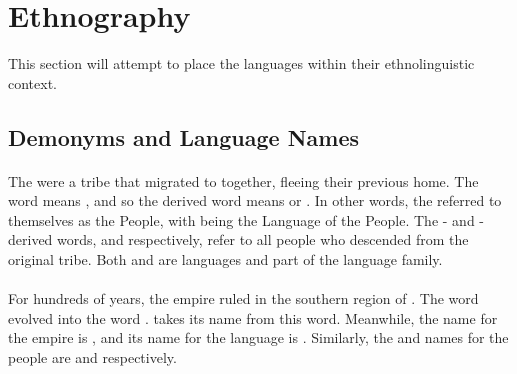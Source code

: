 \section{Ethnography}
\label{sec:tvk-ethnography}

This section will attempt to place the \langtvk{} languages within their ethnolinguistic context.

\subsection{Demonyms and Language Names}
\label{subsec:tvk-demonyms}

\paragraph{\langtvk}

The \peoptvk{} were a tribe that migrated to \landn{} together, fleeing their previous home. The \langtvk{} word   means , and so the derived word \fw{\npeoptvk}  means  or . In other words, the \peoptvk{} referred to themselves as the People, with \fw{\nlangtvk} being the Language of the People. The \langank- and \langrdk-derived words,   and   respectively, refer to all people who descended from the original \peoptvk{} tribe. Both \langank{} and \langrdk{} are \peoptvk{} languages and part of the \langtvk{} language family.

\paragraph{\langank}

For hundreds of years, the empire ruled in the southern region of \landn. The \langtvk{} word    evolved into the \langank{} word  . \fw{\nlangank}   takes its name from this word. Meanwhile, the \langrdk{} name for the empire is  , and its name for the \langank{} language is  . Similarly, the \langank{} and \langrdk{} names for the \langank{} people are   and   respectively.

\paragraph{\langrdk}

